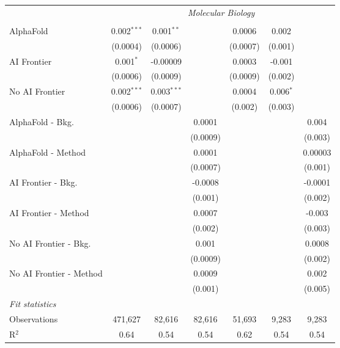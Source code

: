 \begin{tabular}{lcccccc}
 & \multicolumn{6}{c}{\textit{Molecular Biology}} \\ \\
   AlphaFold               & 0.002$^{***}$ & 0.001$^{**}$  &          & 0.0006   & 0.002       &   \\   
                           & (0.0004)      & (0.0006)      &          & (0.0007) & (0.001)     &   \\   
   AI Frontier             & 0.001$^{*}$   & -0.00009      &          & 0.0003   & -0.001      &   \\   
                           & (0.0006)      & (0.0009)      &          & (0.0009) & (0.002)     &   \\   
   No AI Frontier          & 0.002$^{***}$ & 0.003$^{***}$ &          & 0.0004   & 0.006$^{*}$ &   \\   
                           & (0.0006)      & (0.0007)      &          & (0.002)  & (0.003)     &   \\   
   AlphaFold - Bkg.        &               &               & 0.0001   &          &             & 0.004\\   
                           &               &               & (0.0009) &          &             & (0.003)\\   
   AlphaFold - Method      &               &               & 0.0001   &          &             & 0.00003\\   
                           &               &               & (0.0007) &          &             & (0.001)\\   
   AI Frontier - Bkg.      &               &               & -0.0008  &          &             & -0.0001\\   
                           &               &               & (0.001)  &          &             & (0.002)\\   
   AI Frontier - Method    &               &               & 0.0007   &          &             & -0.003\\   
                           &               &               & (0.002)  &          &             & (0.003)\\   
   No AI Frontier - Bkg.   &               &               & 0.001    &          &             & 0.0008\\   
                           &               &               & (0.0009) &          &             & (0.002)\\   
   No AI Frontier - Method &               &               & 0.0009   &          &             & 0.002\\   
                           &               &               & (0.001)  &          &             & (0.005)\\   
   \midrule
   \emph{Fit statistics}\\
   Observations            & 471,627       & 82,616        & 82,616   & 51,693   & 9,283       & 9,283\\  
   R$^2$                   & 0.64          & 0.54          & 0.54     & 0.62     & 0.54        & 0.54\\  
   

\end{tabular}
